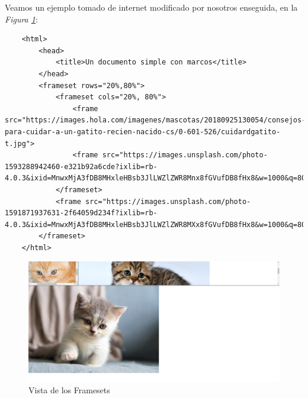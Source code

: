 Veamos un ejemplo tomado de internet modificado por nosotros enseguida, en la \textit{Figura \ref{fig: 9}}:
\begin{lstlisting}
    <html>
        <head>
            <title>Un documento simple con marcos</title>
        </head>
        <frameset rows="20%,80%">
            <frameset cols="20%, 80%">
                <frame src="https://images.hola.com/imagenes/mascotas/20180925130054/consejos-para-cuidar-a-un-gatito-recien-nacido-cs/0-601-526/cuidardgatito-t.jpg">
                <frame src="https://images.unsplash.com/photo-1593288942460-e321b92a6cde?ixlib=rb-4.0.3&ixid=MnwxMjA3fDB8MHxleHBsb3JlLWZlZWR8Mnx8fGVufDB8fHx8&w=1000&q=80">
            </frameset>
            <frame src="https://images.unsplash.com/photo-1591871937631-2f64059d234f?ixlib=rb-4.0.3&ixid=MnwxMjA3fDB8MHxleHBsb3JlLWZlZWR8MXx8fGVufDB8fHx8&w=1000&q=80">
        </frameset>
    </html>
\end{lstlisting}
\begin{figure}[H]
    \centering
    \caption{Vista de los Framesets}
    \label{fig: 9}
    \includegraphics[width=13cm]{ss_html/frames_1.png}
\end{figure}

